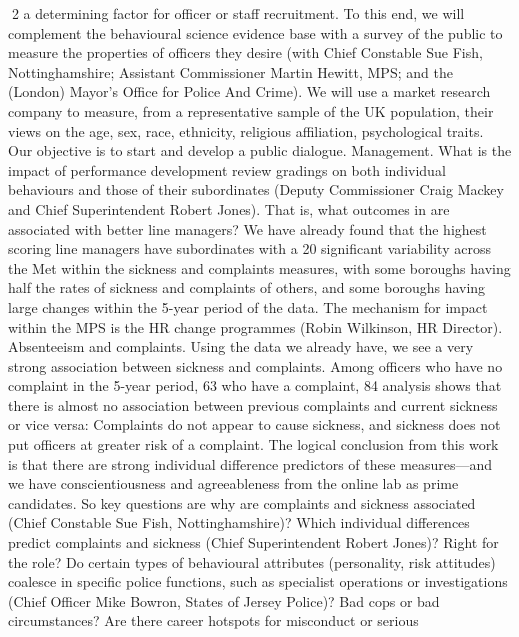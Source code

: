 \documentclass[11pt, a4paper]{article}
\begin{document}
2
a determining factor for officer or staff recruitment. To this end, we will complement the
behavioural science evidence base with a survey of the public to measure the properties of
officers they desire (with Chief Constable Sue Fish, Nottinghamshire; Assistant
Commissioner Martin Hewitt, MPS; and the (London) Mayor’s Office for Police And Crime).
We will use a market research company to measure, from a representative sample of the UK
population, their views on the age, sex, race, ethnicity, religious affiliation, psychological
traits. Our objective is to start and develop a public dialogue.
Management. What is the impact of performance development review gradings on both
individual behaviours and those of their subordinates (Deputy Commissioner Craig Mackey
and Chief Superintendent Robert Jones). That is, what outcomes in are associated with
better line managers? We have already found that the highest scoring line managers have
subordinates with a 20%
significant variability across the Met within the sickness and complaints measures, with
some boroughs having half the rates of sickness and complaints of others, and some
boroughs having large changes within the 5-year period of the data. The mechanism for
impact within the MPS is the HR change programmes (Robin Wilkinson, HR Director).
Absenteeism and complaints. Using the data we already have, we see a very strong
association between sickness and complaints. Among officers who have no complaint in the
5-year period, 63%
who have a complaint, 84%
analysis shows that there is almost no association between previous complaints and current
sickness or vice versa: Complaints do not appear to cause sickness, and sickness does not
put officers at greater risk of a complaint. The logical conclusion from this work is that there
are strong individual difference predictors of these measures—and we have
conscientiousness and agreeableness from the online lab as prime candidates. So key
questions are why are complaints and sickness associated (Chief Constable Sue Fish,
Nottinghamshire)? Which individual differences predict complaints and sickness (Chief
Superintendent Robert Jones)?
Right for the role? Do certain types of behavioural attributes (personality, risk attitudes)
coalesce in specific police functions, such as specialist operations or investigations (Chief
Officer Mike Bowron, States of Jersey Police)?
Bad cops or bad circumstances? Are there career hotspots for misconduct or serious
\end{document}
